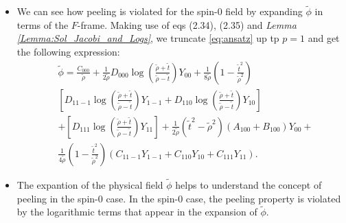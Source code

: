 \documentclass{beamer}
\theoremstyle{remark}
\theoremstyle{plain}
\theoremstyle{plain}
\begin{document}
\begin{frame}
  \begin{itemize}
    \item We can see how peeling is violated for the spin-0 field by expanding $\tilde{\phi}$ in terms of the $F$-frame. Making use of eqs (2.34), (2.35) and \emph{Lemma \ref{Lemma:Sol_Jacobi_and_Logs}}, we truncate \eqref{eq:ansatz} up tp $p = 1$ and get the following expression:
    \begin{align}\label{eq:phi_tilde}
      & \tilde{\phi}=\frac{C_{000}}{\tilde{\rho}}+\frac{1}{2 \tilde{\rho}} D_{000} \log \left(\frac{\tilde{\rho}+\tilde{t}}{\tilde{\rho}-\tilde{t}}\right) Y_{00} + \frac{1}{8{\tilde{\rho}}}\left(1-\frac{\tilde{t}^{2}}{\tilde{\rho}^{2}}\right) \nonumber \\
      & \left[D_{11-1}\log \left(\frac{\tilde{\rho}+\tilde{t}}{\tilde{\rho}-\tilde{t}}\right) Y_{1-1}+D_{110} \log\left(\frac{\tilde{\rho}+\tilde{t}}{\tilde{\rho}-\tilde{t}}\right) Y_{10}\right] \nonumber \\     
      &+\left[D_{111} \log\left(\frac{\tilde{\rho}+\tilde{t}}{\tilde{\rho}-\tilde{t}}\right)Y_{11}\right]+ \frac{1}{2 \tilde{\rho}}\left(\tilde{t}^{2}-\tilde{\rho}^{2}\right)\left(A_{100}+B_{100}\right) Y_{00}+ \nonumber \\
      &\frac{1}{4 \tilde{\rho}}\left(1-\frac{\tilde{t}^{2}}{\tilde{\rho}^{2}}\right)\left(C_{11-1} Y_{1-1}+C_{110} Y_{10}+C_{111} Y_{11}\right).
    \end{align}
    \item The expantion of the physical field $\tilde{\phi}$ helps to understand the concept of peeling in the spin-0 case. In the spin-0 case, the peeling property is violated by the logarithmic terms that appear in the expansion of $\tilde{\phi}$.
  \end{itemize}
\end{frame}
\end{document}
